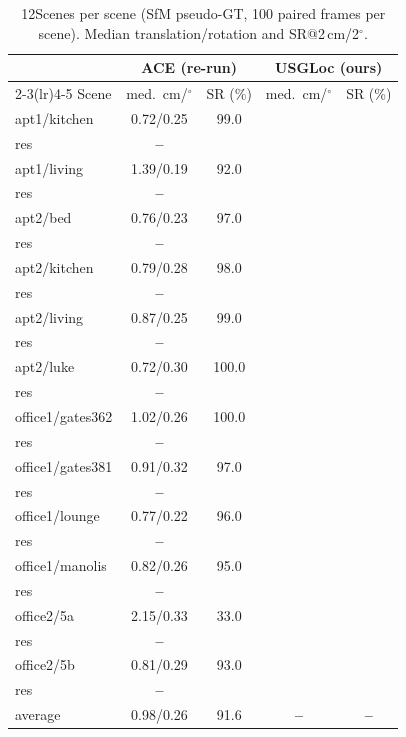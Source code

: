 \documentclass[journal]{IEEEtran}
\newcommand{\res}{{\color{red}\textbf{--}}}
\newcommand{\method}{USGLoc}
\begin{document}
\begin{table}[h]
\caption{12Scenes per scene (SfM pseudo-GT, 100 paired frames per scene). Median translation/rotation and SR@2\,cm/2$^\circ$.}
\label{tab:12scenes-full}
\centering\footnotesize
\setlength{\tabcolsep}{4pt}
\begin{tabular}{@{}lcccc@{}}
\toprule
& \multicolumn{2}{c}{ACE (re-run)} & \multicolumn{2}{c}{\method{} (ours)} \\
\cmidrule(lr){2-3}\cmidrule(lr){4-5}
Scene & med.\ cm/$^\circ$ & SR (\%) & med.\ cm/$^\circ$ & SR (\%) \\
\midrule
apt1/kitchen & 0.72/0.25 & 99.0 & \\res & \res \\
apt1/living & 1.39/0.19 & 92.0 & \\res & \res \\
apt2/bed & 0.76/0.23 & 97.0 & \\res & \res \\
apt2/kitchen & 0.79/0.28 & 98.0 & \\res & \res \\
apt2/living & 0.87/0.25 & 99.0 & \\res & \res \\
apt2/luke & 0.72/0.30 & 100.0 & \\res & \res \\
office1/gates362 & 1.02/0.26 & 100.0 & \\res & \res \\
office1/gates381 & 0.91/0.32 & 97.0 & \\res & \res \\
office1/lounge & 0.77/0.22 & 96.0 & \\res & \res \\
office1/manolis & 0.82/0.26 & 95.0 & \\res & \res \\
office2/5a & 2.15/0.33 & 33.0 & \\res & \res \\
office2/5b & 0.81/0.29 & 93.0 & \\res & \res \\
\midrule
average & 0.98/0.26 & 91.6 & \res & \res \\
\bottomrule
\end{tabular}
\end{table}

\end{document}
